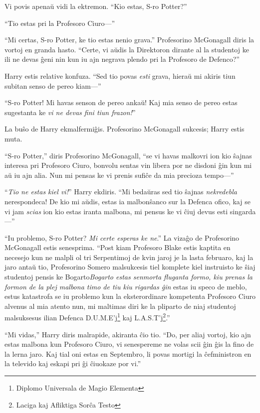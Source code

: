 Vi povis apenaŭ vidi la ektremon. ``Kio estas, S-ro Potter?''

``Tio estas pri la Profesoro Ciuro—''

``Mi certas, S-ro Potter, ke tio estas nenio grava.'' Profesorino
McGonagall diris la vortoj en granda hasto. ``Certe, vi aŭdis la
Direktoron dirante al la studentoj ke ili ne devas ĝeni nin kun iu ajn
negrava plendo pri la Profesoro de Defenco?''

Harry estis relative konfuza. ``Sed tio povas \emph{esti} grava,
hieraŭ mi akiris tiun subitan senso de pereo kiam—''

``S-ro Potter! Mi havas senson de pereo ankaŭ! Kaj mia senso de pereo
estas sugestanta ke \emph{vi ne devas fini tiun frazon!}''

La buŝo de Harry ekmalfermiĝis. Profesorino McGonagall sukcesis; Harry estis muta.

``S-ro Potter,'' diris Profesorino McGonagall, ``se vi havas malkovri
ion kio ŝajnas interesa pri Profesoro Ciuro, bonvolu sentas vin libera
por ne disdoni ĝin kun mi aŭ iu ajn alia. Nun mi pensas ke vi prenis
sufiĉe da mia precioza tempo—''  

``\emph{Tio ne estas kiel vi!}'' Harry ekdiris. ``Mi bedaŭras sed tio
ŝajnas \emph{nekredebla} nerespondeca! De kio mi aŭdis, estas ia
malbonŝanco sur la Defenca ofico, kaj se vi jam \emph{scias} ion kio
estas iranta malbona, mi pensus ke vi ĉiuj devus esti singarda—''

``Iu problemo, S-ro Potter? \emph{Mi certe esperas ke ne}.'' La vizaĝo
de Profesorino McGonagall estis senesprima. ``Post kiam Profesoro
Blake estis kaptita en necesejo kun ne malpli ol tri Serpentimoj de
kvin jaroj je la lasta februaro, kaj la jaro antaŭ tio, Profesorino
Somero malsukcesis tiel komplete kiel instruisto ke ŝiaj studentoj
pensis ke Bogarto\emph{Bogarto estas senmorta fluganta formo, kiu
prenas la formon de la plej malbona timo de tiu kiu rigardas ĝin}
estas iu speco de meblo, estus katastrofa se iu problemo kun la
eksterordinare kompetenta Profesoro Ciuro alvenus al mia atento nun,
mi maltimas diri ke la pliparto de niaj studentoj malsuksesus ilian
Defenca D.U.M.E'j\footnote{Diplomo Universala de Magio Elementa} kaj
L.A.S.T'j\footnote{Laciga kaj Afliktiga Sorĉa Testo}.''

``Mi vidas,'' Harry diris malrapide, akiranta ĉio tio. ``Do, per aliaj
vortoj, kio ajn estas malbona kun Profesoro Ciuro, vi senespereme ne
volas scii ĝin ĝis la fino de la lerna jaro. Kaj tial oni estas en
Septembro, li povas mortigi la ĉefministron en la televido kaj eskapi
pri ĝi ĉiuokaze por vi.''

